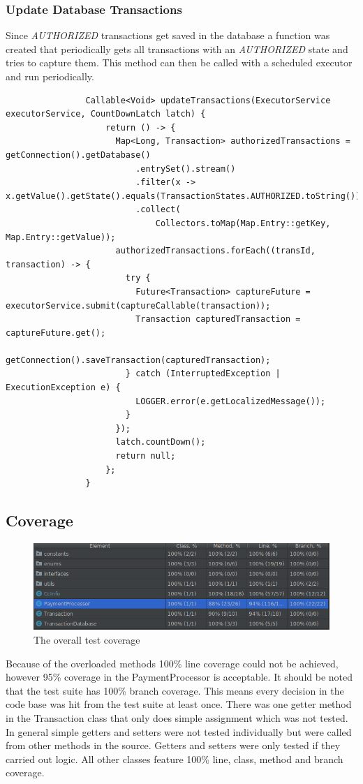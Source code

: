 \documentclass[11pt, a4paper]{article}
\begin{document}
        \subsubsection{Update Database Transactions} 
            Since \emph{AUTHORIZED} transactions get saved in the database a function was created that periodically gets all transactions with an \emph{AUTHORIZED} state and tries to capture them. This method can then be called with a scheduled executor and run periodically.

            \begin{lstlisting}
                Callable<Void> updateTransactions(ExecutorService executorService, CountDownLatch latch) {
                    return () -> {
                      Map<Long, Transaction> authorizedTransactions = getConnection().getDatabase()
                          .entrySet().stream()
                          .filter(x -> x.getValue().getState().equals(TransactionStates.AUTHORIZED.toString()))
                          .collect(
                              Collectors.toMap(Map.Entry::getKey, Map.Entry::getValue));
                      authorizedTransactions.forEach((transId, transaction) -> {
                        try {
                          Future<Transaction> captureFuture = executorService.submit(captureCallable(transaction));
                          Transaction capturedTransaction = captureFuture.get();
                          getConnection().saveTransaction(capturedTransaction);
                        } catch (InterruptedException | ExecutionException e) {
                          LOGGER.error(e.getLocalizedMessage());
                        }
                      });
                      latch.countDown();
                      return null;
                    };
                }
            \end{lstlisting}
    \subsection{Coverage}
        \begin{figure}[H]
            \includegraphics[width=\textwidth]{coverage}
            \caption{The overall test coverage}
        \end{figure}
        Because of the overloaded methods 100\% line coverage could not be achieved, however 95\% coverage in the PaymentProcessor is acceptable. It should be noted that the test suite has 100\% branch coverage. This means every decision in the code base was hit from the test suite at least once. There was one getter method in the Transaction class that only does simple assignment which was not tested. In general simple getters and setters were not tested individually but were called from other methods in the source. Getters and setters were only tested if they carried out logic. All other classes feature 100\% line, class, method and branch coverage.
\newpage
\end{document}
